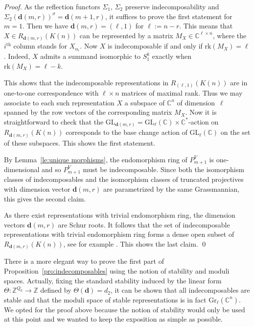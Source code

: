 \documentclass[smallextended,envcountsect,envcountsame]{svjour3}
\numberwithin{equation}{section}
\newcommand{\CC}{\mathbb{C}}
\newcommand{\ZZ}{\mathbb{Z}}
\newcommand{\bfd}{\mathbf{d}}
\newcommand{\Gr}{\mathrm{Gr}}
\newcommand{\GL}{\mathrm{GL}}
\newcommand{\rk}{\mathrm{rk}}
\begin{document}
\begin{proof}
  As the reflection functors $\Sigma_1,\,\Sigma_2$ preserve indecomposability and $\Sigma_2(\bfd(m,r))^\sigma=\bfd(m+1,r)$, it suffices to prove the first statement for $m=1$.
  Then we have $\bfd(m,r)=(\ell,1)$ for $\ell:=n-r$.
  This means that $X\in R_{\bfd(m,r)}(K(n))$ can be represented by a matrix $M_X\in\CC^{\ell\times n}$, where the $i^{\mathrm{th}}$ column stands for $X_{\alpha_i}$.
  Now $X$ is indecomposable if and only if $\rk(M_X)=\ell$.
  Indeed, $X$ admits a summand isomorphic to $S_1^k$ exactly when $\rk(M_X)=\ell-k$.

  This shows that the indecomposable representations in $R_{(\ell,1)}(K(n))$ are in one-to-one correspondence with $\ell\times n$ matrices of maximal rank.
  Thus we may associate to each such representation $X$ a subspace of $\CC^n$ of dimension~$\ell$ spanned by the row vectors of the corresponding matrix $M_X$.
  Now it is straightforward to check that the $\GL_{\bfd(m,r)}=\GL_\ell(\CC)\times\CC^\ast$-action on $R_{\bfd(m,r)}(K(n))$ corresponds to the base change action of $\GL_\ell(\CC)$ on the set of these subspaces.
  This shows the first statement.

  By Lemma~\ref{le:unique morphisms}, the endomorphism ring of $P_{m+1}^V$ is one-dimensional and so $P_{m+1}^V$ must be indecomposable.
  Since both the isomorphism classes of indecomposables and the isomorphism classes of truncated projectives with dimension vector $\bfd(m,r)$ are parametrized by the same Grassmannian, this gives the second claim.

  As there exist representations with trivial endomorphism ring, the dimension vectors $\bfd(m,r)$ are Schur roots.
  It follows that the set of indecomposable representations with trivial endomorphism ring forms a dense open subset of $R_{\bfd(m,r)}(K(n))$, see for example \cite[Theorem 2.2]{sch}.
  This shows the last claim.
\qed\end{proof}
\begin{remark}
  There is a more elegant way to prove the first part of Proposition~\ref{pro:indecomposables} using the notion of stability and moduli spaces.
  Actually, fixing the standard stability induced by the linear form $\Theta:\ZZ^{Q_0}\to\ZZ$ defined by $\Theta(\bfd)=d_2$, it can be shown that all indecomposables are stable and that the moduli space of stable representations is in fact $\Gr_\ell(\CC^n)$.
  We opted for the proof above because the notion of stability would only be used at this point and we wanted to keep the exposition as simple as possible. 
\end{remark}
\end{document}
